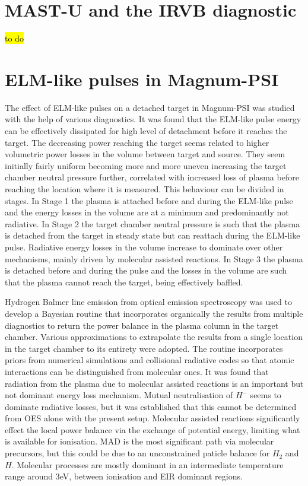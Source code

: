 

\section{MAST-U and the IRVB diagnostic}\label{MAST-U and the IRVB diagnostic}
\hl{to do}

\section{ELM-like pulses in Magnum-PSI}\label{ELM-like pulses in Magnum-PSI}
The effect of ELM-like pulses on a detached target in Magnum-PSI was studied with the help of various diagnostics. It was found that the ELM-like pulse energy can be effectively dissipated for high level of detachment before it reaches the target. The decreasing power reaching the target seems related to higher volumetric power losses in the volume between target and source. They seem initially fairly uniform becoming more and more uneven increasing the target chamber neutral pressure further, correlated with increased loss of plasma before reaching the location where it is measured. This behaviour can be divided in stages. In Stage 1 the plasma is attached before and during the ELM-like pulse and the energy losses in the volume are at a minimum and predominantly not radiative. In Stage 2 the target chamber neutral pressure is such that the plasma is detached from the target in steady state but can reattach during the ELM-like pulse. Radiative energy losses in the volume increase to dominate over other mechanisms, mainly driven by molecular assisted reactions. In Stage 3 the plasma is detached before and during the pulse and the losses in the volume are such that the plasma cannot reach the target, being effectively baffled.

Hydrogen Balmer line emission from optical emission spectroscopy was used to develop a Bayesian routine that incorporates organically the results from multiple diagnostics to return the power balance in the plasma column in the target chamber. Various approximations to extrapolate the results from a single location in the target chamber to its entirety were adopted. The routine incorporates priors from numerical simulations and collisional radiative codes so that atomic interactions can be distinguished from molecular ones. It was found that radiation from the plasma due to molecular assisted reactions is an important but not dominant energy loss mechanism. Mutual neutralisation of ${H}^-$ seems to dominate radiative losses, but it was established that this cannot be determined from OES alone with the present setup. Molecular assisted reactions significantly effect the local power balance via the exchange of potential energy, limiting what is available for ionisation. MAD is the most significant path via molecular precursors, but this could be due to an unconstrained paticle balance for $H_2$ and $H$. Molecular processes are mostly dominant in an intermediate temperature range around 3eV, between ionisation and EIR dominant regions.

